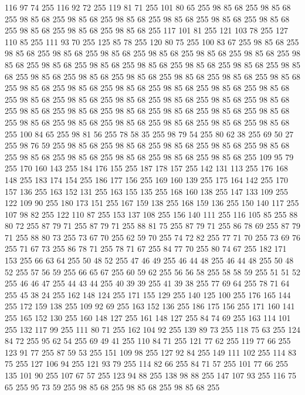 116 97 74 255 116 92 72 255 119 81 71 255 101 80 65 255 98 85 68 255 98 85 68 255 98 85 68 255 98 85 68 255 98 85 68 255 98 85 68 255 98 85 68 255 98 85 68 255 98 85 68 255 98 85 68 255 98 85 68 255 117 101 81 255 121 103 78 255 127 110 85 255 111 93 70 255 125 85 78 255 120 80 75 255 100 83 67 255 98 85 68 255 98 85 68 255 98 85 68 255 98 85 68 255 98 85 68 255 98 85 68 255 98 85 68 255 98 85 68 255 98 85 68 255 98 85 68 255 98 85 68 255 98 85 68 255 98 85 68 255 98 85 68 255 98 85 68 255 98 85 68 255 98 85 68 255 98 85 68 255 98 85 68 255 98 85 68 255 98 85 68 255 98 85 68 255 98 85 68 255 98 85 68 255 98 85 68 255 98 85 68 255 98 85 68 255 98 85 68 255 98 85 68 255 98 85 68 255 98 85 68 255 98 85 68 255 98 85 68 255 98 85 68 255 98 85 68 255 98 85 68 255 98 85 68 255 98 85 68 255 98 85 68 255 98 85 68 255 98 85 68 255 98 85 68 255
98 85 68 255 98 85 68 255 100 84 65 255 98 81 56 255 78 58 35 255 98 79 54 255 80 62 38 255 69 50 27 255 98 76 59 255 98 85 68 255 98 85 68 255 98 85 68 255 98 85 68 255 98 85 68 255 98 85 68 255 98 85 68 255 98 85 68 255 98 85 68 255 98 85 68 255 109 95 79 255 170 160 143 255 184 176 155 255 187 178 157 255 142 131 113 255 176 168 148 255 183 174 154 255 186 177 156 255 169 160 139 255 175 164 142 255 170 157 136 255 163 152 131 255 163 155 135 255 168 160 138 255 147 133 109 255 122 109 90 255 180 173 151 255 167 159 138 255 168 159 136 255 150 140 117 255 107 98 82 255 122 110 87 255 153 137 108 255 156 140 111 255 116 105 85 255 88 80 72 255 87 79 71 255 87 79 71 255 88 81 75 255 87 79 71 255 86 78 69 255 87 79 71 255 88 80 73 255 73 67 70 255 62 59 70 255 74 72 82 255 77 71 70 255 73 69 76 255 71 67 73 255 86 78 71 255 78 71 67 255 84 77 70 255 80 74 67 255 182 171 153 255 66 63 64 255
50 48 52 255 47 46 49 255 46 44 48 255 46 44 48 255 50 48 52 255 57 56 59 255 66 65 67 255 60 59 62 255 56 56 58 255 58 58 59 255 51 51 52 255 46 46 47 255 44 43 44 255 40 39 39 255 41 39 38 255 77 69 64 255 78 71 64 255 45 38 24 255 162 148 124 255 171 155 129 255 140 125 100 255 176 165 144 255 172 159 138 255 109 92 69 255 163 152 136 255 186 175 156 255 171 160 141 255 165 152 130 255 160 148 127 255 161 148 127 255 84 74 69 255 163 114 101 255 132 117 99 255 111 80 71 255 162 104 92 255 139 89 73 255 118 75 63 255 124 84 72 255 95 62 54 255 69 49 41 255 110 84 71 255 121 77 62 255 119 77 66 255 123 91 77 255 87 59 53 255 151 109 98 255 127 92 84 255 149 111 102 255 114 83 75 255 127 106 94 255 121 93 79 255 114 82 66 255 84 71 57 255 101 77 66 255 135 101 90 255 107 67 57 255 123 94 88 255 138 98 88 255 147 107 93 255 116 75 65 255 95 73 59 255 98 85 68 255 98 85 68 255 98 85 68 255
